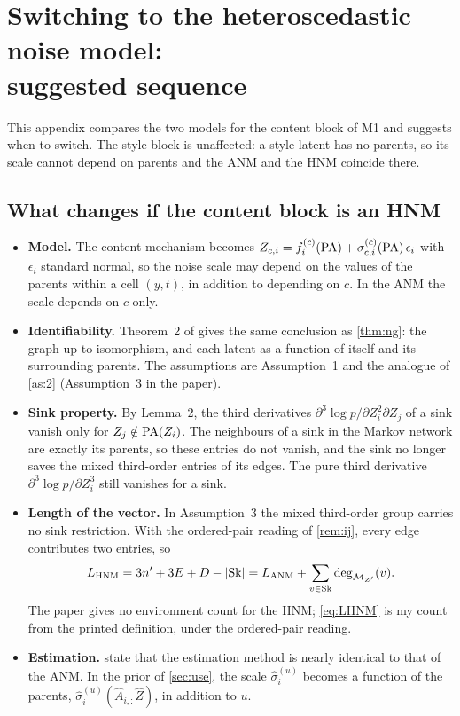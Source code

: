 \section{Switching to the heteroscedastic noise model:\texorpdfstring{\\}{--}suggested sequence}
\label{app:hnm}

This appendix compares the two models for the content block of M1 and suggests when to switch. The style block
is unaffected: a style latent has no parents, so its scale cannot depend on parents and the ANM and the HNM
coincide there.

\subsection{What changes if the content block is an HNM}
\begin{itemize}[leftmargin=1.5em]
\item \textbf{Model.} The content mechanism becomes $Z_{c,i}=f_i^{(c)}(\mathrm{PA})+\sigma_{c,i}^{(c)}(\mathrm{PA})\,\epsilon_i$
      with $\epsilon_i$ standard normal, so the noise scale may depend on the values of the parents within a
      cell $(y,t)$, in addition to depending on $c$. In the ANM the scale depends on $c$ only.
\item \textbf{Identifiability.} Theorem~2 of \cite{ng2025} gives the same conclusion as \cref{thm:ng}: the
      graph up to isomorphism, and each latent as a function of itself and its surrounding parents. The
      assumptions are Assumption~1 and the analogue of \cref{as:2} (Assumption~3 in the paper).
\item \textbf{Sink property.} By Lemma~2, the third derivatives $\partial^3\log p/\partial Z_i^2\partial Z_j$ of a
      sink vanish only for $Z_j\notin\mathrm{PA}(Z_i)$. The neighbours of a sink in the Markov network are exactly its
      parents, so these entries do not vanish, and the sink no longer saves the mixed third-order entries
      of its edges. The pure third derivative $\partial^3\log p/\partial Z_i^3$ still vanishes for a sink.
\item \textbf{Length of the vector.} In Assumption~3 the mixed third-order group carries no sink restriction.
      With the ordered-pair reading of \cref{rem:ij}, every edge contributes two entries, so
      \begin{equation}
      L_{\mathrm{HNM}}=3n'+3E+D-|\mathrm{Sk}|=L_{\mathrm{ANM}}+\sum_{v\in\mathrm{Sk}}\deg_{\mathcal{M}_{Z'}}(v).
      \label{eq:LHNM}
      \end{equation}
      The paper gives no environment count for the HNM; \cref{eq:LHNM} is my count from the printed
      definition, under the ordered-pair reading.
\item \textbf{Estimation.} \cite{ng2025} state that the estimation method is nearly identical to that of
      the ANM. In the prior of \cref{sec:use}, the scale $\hat\sigma_i^{(u)}$ becomes a function of the
      parents, $\hat\sigma_i^{(u)}(\hat A_{i,:}\hat Z)$, in addition to $u$.
\end{itemize}

